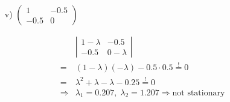 \documentclass[12pt,a4paper]{article}
\begin{document}
\begin{itemize}
    \item[v)] $ \begin{pmatrix}
    1 & -0.5 \\ 
    -0.5 & 0
    \end{pmatrix} $
\end{itemize}

\begin{align*}
  & \left|
  \begin{matrix}
    1 - \lambda & -0.5 \\ 
    -0.5 &  0 - \lambda
    \end{matrix}
    \right| \\
    = & (1 - \lambda)( - \lambda) - 0.5 \cdot 0.5 \overset{!}{=} 0 \\
    = & \lambda^2 + \lambda - \lambda - 0.25 \overset{!}{=} 0\\
    \Rightarrow & \lambda_1 = 0.207, \; \lambda_2 = 1.207 \Rightarrow \text{not stationary} 
\end{align*}
\end{document}
